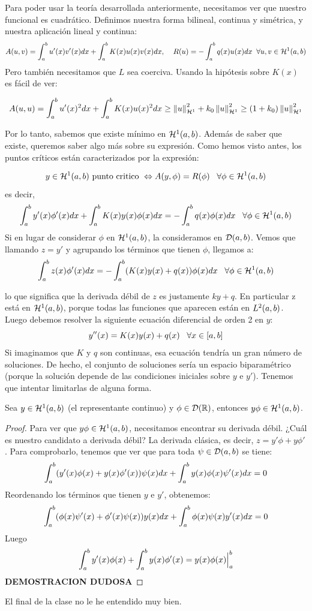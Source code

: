 Para poder usar la teoría desarrollada anteriormente, necesitamos ver que nuestro funcional es cuadrático. Definimos nuestra forma bilineal, continua y simétrica, y nuestra aplicación lineal y continua:
\[
A(u,v)=\integral{a}{b}{u'(x)v'(x)dx}+\integral{a}{b}{K(x)u(x)v(x)dx}, \; \espacio R(u)=-\integral{a}{b}{q(x)u(x)dx} \;\;\forall u,v\in\sobolev{1}
\]
Pero también necesitamos que $L$ sea coerciva. Usando la hipótesis sobre $K(x)$ es fácil de ver:


\[
A(u,u)=\integral{a}{b}{u'(x)^2dx}+\integral{a}{b}{K(x)u(x)^2dx}\geq\normasobolev{1}{u}^2+k_0\normasobolev{1}{u}^2\geq(1+k_0)\normasobolev{1}{u}^2
\]

Por lo tanto, sabemos que existe mínimo en $\sobolev{1}$. Además de saber que existe, queremos saber algo más sobre su expresión. Como hemos visto antes, los puntos críticos están caracterizados por la expresión:

\[
y\in\sobolev{1} \text{ punto critico } \Leftrightarrow A(y,\phi)=R(\phi) \espacio \forall \phi\in\sobolev{1}
\]
es decir,
\[
\integral{a}{b}{y'(x)\phi'(x)dx}+\integral{a}{b}{K(x)y(x)\phi(x)dx}=-\integral{a}{b}{q(x)\phi(x)dx} \espacio  \forall\phi\in\sobolev{1}
\]
Si en lugar de considerar $\phi$ en $\sobolev{1}$, la consideramos en $\soportecompacto$. Vemos que llamando $z=y'$ y agrupando los términos que tienen $\phi$, llegamos a:
\[
\integral{a}{b}{z(x)\phi'(x)dx}=-\integral{a}{b}{(K(x)y(x)+q(x))\phi(x)dx} \espacio  \forall\phi\in\sobolev{1}
\]

lo que significa que la derivada débil de $z$ es justamente $ky+q$. En particular z está en $\sobolev{1}$, porque todas las funciones que aparecen están en $\lebesgue{2}$. Luego debemos resolver la siguiente ecuación diferencial de orden 2 en $y$:
\[
y''(x)=K(x)y(x)+q(x) \espacio \forall x \in[a,b]
\]
Si imaginamos que $K$ y $q$ son continuas, esa ecuación tendría un gran número de soluciones. De hecho, el conjunto de soluciones sería un espacio biparamétrico (porque la solución depende de las condiciones iniciales sobre $y$ e $y'$). Tenemos que intentar limitarlas de alguna forma.

\begin{prop}
Sea $y\in\sobolev{1}$ (el representante continuo) y $\phi\in\mathcal{D}(\R)$, entonces $y\phi\in\sobolev{1}$.
\end{prop}
\begin{proof}
Para ver que $y\phi\in\sobolev{1}$, necesitamos encontrar su derivada débil. ¿Cuál es nuestro candidato a derivada débil? La derivada clásica, es decir, $z=y'\phi+y\phi'$. Para comprobarlo, tenemos que ver que para toda $\psi\in\soportecompacto$ se tiene:
\[
\integral{a}{b}{(y'(x)\phi(x)+y(x)\phi'(x))\psi(x)dx}+\integral{a}{b}{y(x)\phi(x)\psi'(x)dx}=0
\]
Reordenando los términos que tienen $y$ e $y'$, obtenemos:
\[
\integral{a}{b}{(\phi(x)\psi'(x)+\phi'(x)\psi(x))y(x)dx}+\integral{a}{b}{\phi(x)\psi(x)y'(x)dx}=0
\]
Luego
\[
\integral{a}{b}{y'(x)\phi(x)}+\integral{a}{b}{y(x)\phi'(x)}=y(x)\phi(x)\Big|^b_a
\] 
\textbf{DEMOSTRACION DUDOSA}
\end{proof}
El final de la clase no le he entendido muy bien.